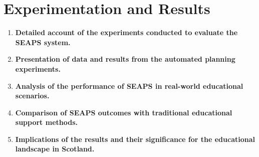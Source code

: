 \section{Experimentation and Results}
\begin{enumerate}
    \item \textbf{Detailed account of the experiments conducted to evaluate the SEAPS system.}
    \item \textbf{Presentation of data and results from the automated planning experiments.}
    \item \textbf{Analysis of the performance of SEAPS in real-world educational scenarios.}
    \item \textbf{Comparison of SEAPS outcomes with traditional educational support methods.}
    \item \textbf{Implications of the results and their significance for the educational landscape in Scotland.}
\end{enumerate}

